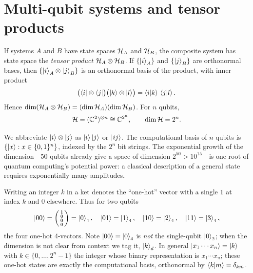 \section{Multi-qubit systems and tensor products}
\label{sec:lec01-2}

\begin{definition}\label{def:lec01-tensor}
If systems $A$ and $B$ have state spaces $\mathcal{H}_A$ and $\mathcal{H}_B$, the composite
system has state space the \emph{tensor product} $\mathcal{H}_A\otimes\mathcal{H}_B$. If
$\{\ket{i}_A\}$ and $\{\ket{j}_B\}$ are orthonormal bases, then
$\{\ket{i}_A\otimes\ket{j}_B\}$ is an orthonormal basis of the product, with inner
product
\[
  \bigl(\bra{i}\otimes\bra{j}\bigr)\bigl(\ket{k}\otimes\ket{l}\bigr)
    =\braket{i|k}\,\braket{j|l}.
\]
Hence $\dim(\mathcal{H}_A\otimes\mathcal{H}_B)=(\dim\mathcal{H}_A)(\dim\mathcal{H}_B)$. For $n$ qubits,
\[
  \mathcal{H}=(\mathbb{C}^{2})^{\otimes n}\cong\mathbb{C}^{2^{n}},\qquad \dim\mathcal{H}=2^{n}.
\]
\end{definition}

We abbreviate $\ket{i}\otimes\ket{j}$ as $\ket{i}\ket{j}$ or $\ket{ij}$. The
computational basis of $n$ qubits is $\{\ket{x}:x\in\{0,1\}^{n}\}$, indexed by the
$2^{n}$ bit strings. The exponential growth of the dimension---$50$ qubits already
give a space of dimension $2^{50}>10^{15}$---is one root of quantum computing's
potential power: a classical description of a general state requires exponentially
many amplitudes.

\begin{remark}\label{rem:lec01-ket-k}
Writing an integer $k$ in a ket denotes the ``one-hot'' vector with a single $1$ at
index $k$ and $0$ elsewhere. Thus for two qubits
\[
  \ket{00}=\begin{psmallmatrix}1\\0\\0\\0\end{psmallmatrix}=\ket{0}_4,\quad
  \ket{01}=\ket{1}_4,\quad \ket{10}=\ket{2}_4,\quad \ket{11}=\ket{3}_4,
\]
the four one-hot $4$-vectors. Note $\ket{00}=\ket{0}_4$ is \emph{not} the single-qubit
$\ket{0}_2$; when the dimension is not clear from context we tag it, $\ket{k}_d$. In
general $\ket{x_1\cdots x_n}=\ket{k}$ with $k\in\{0,\dots,2^{n}-1\}$ the integer whose
binary representation is $x_1\cdots x_n$; these one-hot states are exactly the
computational basis, orthonormal by $\braket{k|m}=\delta_{km}$.
\end{remark}

